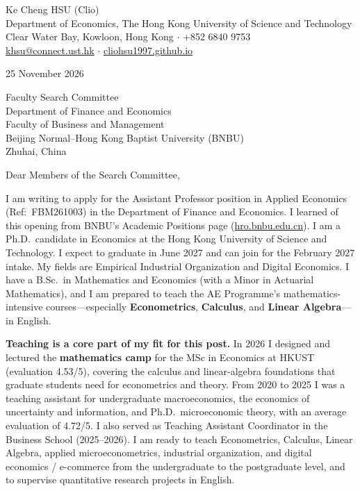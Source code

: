 \documentclass[11pt]{article}
\begin{document}
\begin{flushleft}
Ke Cheng HSU (Clio) \\
Department of Economics, The Hong Kong University of Science and Technology \\
Clear Water Bay, Kowloon, Hong Kong $\cdot$ +852 6840 9753 \\
\href{mailto:khsu@connect.ust.hk}{khsu@connect.ust.hk} $\cdot$ \href{https://cliohsu1997.github.io/}{cliohsu1997.github.io}
\end{flushleft}

25 November 2026

\vspace{0.1em}
Faculty Search Committee \\
Department of Finance and Economics \\
Faculty of Business and Management \\
Beijing Normal--Hong Kong Baptist University (BNBU) \\
Zhuhai, China

\vspace{0.1em}
Dear Members of the Search Committee,

I am writing to apply for the Assistant Professor position in Applied Economics (Ref:\ FBM261003) in the Department of Finance and Economics. I learned of this opening from BNBU's Academic Positions page (\href{https://hro.bnbu.edu.cn/Job_Opportunities_/Job_Vacancy/Academic_Positions.htm}{hro.bnbu.edu.cn}). I am a Ph.D.\ candidate in Economics at the Hong Kong University of Science and Technology. I expect to graduate in June 2027 and can join for the February 2027 intake. My fields are Empirical Industrial Organization and Digital Economics. I have a B.Sc.\ in Mathematics and Economics (with a Minor in Actuarial Mathematics), and I am prepared to teach the AE Programme's mathematics-intensive courses---especially \textbf{Econometrics}, \textbf{Calculus}, and \textbf{Linear Algebra}---in English.

\textbf{Teaching is a core part of my fit for this post.} In 2026 I designed and lectured the \textbf{mathematics camp} for the MSc in Economics at HKUST (evaluation 4.53/5), covering the calculus and linear-algebra foundations that graduate students need for econometrics and theory. From 2020 to 2025 I was a teaching assistant for undergraduate macroeconomics, the economics of uncertainty and information, and Ph.D.\ microeconomic theory, with an average evaluation of 4.72/5. I also served as Teaching Assistant Coordinator in the Business School (2025--2026). I am ready to teach Econometrics, Calculus, Linear Algebra, applied microeconometrics, industrial organization, and digital economics / e-commerce from the undergraduate to the postgraduate level, and to supervise quantitative research projects in English.
\end{document}
